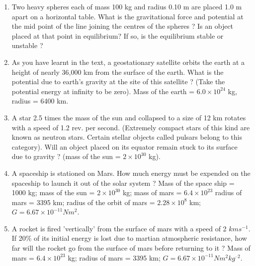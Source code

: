 \begin{enumerate}[label=\arabic*.,ref=\thesection.\theenumi]
\item  Two heavy spheres each of mass 100 kg and radius 0.10 m are placed 1.0 m apart on a horizontal table. What is the gravitational force and potential at the mid point of the line joining the centres of the spheres ? Is an object placed at that point in equilibrium? If so, is the equilibrium stable or unstable ?
\item As you have learnt in the text, a geostationary satellite orbits the earth at a height of nearly 36,000 km from the surface of the earth. What is the potential due to earth's gravity at the site of this satellite ? (Take the potential energy at infinity to be zero). Mass of the earth = $6.0\times10^{24}$
kg, radius = 6400 km.
\item  A star 2.5 times the mass of the sun and collapsed to a size of 12 km rotates with a speed of 1.2 rev. per second. (Extremely compact stars of this kind are known as neutron stars. Certain stellar objects called pulsars belong to this category). Will an object placed on its equator remain stuck to its surface due to gravity ? (mass of the sun = $2\times10^{30}$
kg).
\item  A spaceship is stationed on Mars. How much energy must be expended on the spaceship to launch it out of the solar system ? Mass of the space ship = 1000 kg; mass of the sun = $2\times10^{30}$
kg; mass of mars = $6.4\times10^{23}$ radius of mars = 3395 km; radius of the orbit of mars = $2.28 \times10^8$ km; $G = 6.67\times10^{-11} N m^2$. 
\item A rocket is fired 'vertically' from the surface of mars with a speed of 2 $km s^{-1}$. If 20\%
of its initial energy is lost due to martian atmospheric resistance, how far will the rocket go from the surface of mars before returning to it ? Mass of mars = $6.4\times10^{23}$
kg; radius of mars = 3395 km; $G = 6.67\times10^{-11} N m^2 kg^{–2}$.
\end{enumerate}
